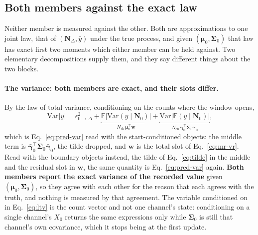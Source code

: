 \begin{appendixbox}
\subsection*{Both members against the exact law}

Neither member is measured against the other. Both are approximations to one joint law, that of
$(\mathbf{N}_\Delta,\bar y)$ under the true process, and given
$(\boldsymbol{\mu}_0,\boldsymbol{\Sigma}_0)$ that law has exact first two moments which either member can be held
against. Two elementary decompositions supply them, and they say different things about the two
blocks.

\paragraph{The variance: both members are exact, and their slots differ.}
By the law of total variance, conditioning on the counts where the window opens,
\begin{equation}
  \mathrm{Var}\bigl[\bar y\bigr]
  = \epsilon^2_{0\to\Delta}
  + \underbracket{\mathbb{E}\bigl[\mathrm{Var}(\bar y \mid \mathbf{N}_0)\bigr]}_{N_{\mathrm{ch}}\,\boldsymbol{\mu}_0^\top\mathbf{w}}
  + \underbracket{\mathrm{Var}\bigl[\mathbb{E}(\bar y \mid \mathbf{N}_0)\bigr]}_{N_{\mathrm{ch}}\,\bar{\boldsymbol{\gamma}}_{0}^\top\boldsymbol{\Sigma}_0\bar{\boldsymbol{\gamma}}_{0}} ,
  \label{eq:ltv}
\end{equation}
which is Eq.~\ref{eq:pred-var} read with the start-conditioned objects: the middle term is
$\bar{\boldsymbol{\gamma}}_0^\top\boldsymbol{\Sigma}_0\bar{\boldsymbol{\gamma}}_0$, the tilde dropped, and $\mathbf{w}$ is
the total slot of Eq.~\ref{eq:mr-vr}. Read with the boundary objects instead, the tilde of
Eq.~\ref{eq:tilde} in the middle and the residual slot in $\mathbf{w}$, the same quantity is
Eq.~\ref{eq:pred-var} again. \textbf{Both members report the exact
variance of the recorded value} given $(\boldsymbol{\mu}_0,\boldsymbol{\Sigma}_0)$, so they agree with each other
for the reason that each agrees with the truth, and nothing is measured by that agreement.
The variable conditioned on in Eq.~\ref{eq:ltv} is the count vector and not one channel's state:
conditioning on a single channel's $X_0$ returns the same expressions only while $\boldsymbol{\Sigma}_0$ is
still that channel's own covariance, which it stops being at the first update.


\end{appendixbox}
